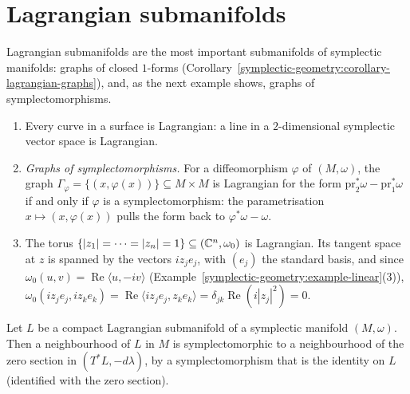 \section{Lagrangian submanifolds}\label{symplectic-geometry:section-lagrangian}

Lagrangian submanifolds are the most important submanifolds of symplectic manifolds: graphs of closed $1$-forms (Corollary~\ref{symplectic-geometry:corollary-lagrangian-graphs}), and, as the next example
shows, graphs of symplectomorphisms.

\begin{example}\label{symplectic-geometry:example-lagrangian}
\begin{enumerate}
\item Every curve in a surface is Lagrangian: a line in a $2$-dimensional symplectic vector space is Lagrangian.
\item \emph{Graphs of symplectomorphisms.} For a diffeomorphism $\varphi$ of $(M, \omega)$, the graph $\Gamma_\varphi = \{(x, \varphi(x))\} \subseteq M \times M$ is Lagrangian for the form
$\mathrm{pr}_2^*\omega - \mathrm{pr}_1^*\omega$ if and only if $\varphi$ is a symplectomorphism: the parametrisation $x \mapsto (x, \varphi(x))$ pulls the form back to $\varphi^*\omega - \omega$.
\item The torus $\{|z_1| = \cdots = |z_n| = 1\} \subseteq (\mathbb{C}^n, \omega_0)$ is Lagrangian. Its tangent space at $z$ is spanned by the vectors $iz_je_j$, with $(e_j)$ the standard basis, and since
$\omega_0(u, v) = \operatorname{Re}\langle u, -iv\rangle$ (Example~\ref{symplectic-geometry:example-linear}(3)), $\omega_0(iz_je_j, iz_ke_k) = \operatorname{Re}\langle iz_je_j, z_ke_k\rangle = \delta_{jk}\operatorname{Re}(i|z_j|^2) = 0$.
\end{enumerate}
\end{example}

\begin{theorem}\label{symplectic-geometry:theorem-weinstein}
Let $L$ be a compact Lagrangian submanifold of a symplectic manifold $(M, \omega)$. Then a neighbourhood of $L$ in $M$ is symplectomorphic to a neighbourhood of the zero section in $(T^*L, -d\lambda)$, by a
symplectomorphism that is the identity on $L$ (identified with the zero section).
\end{theorem}

